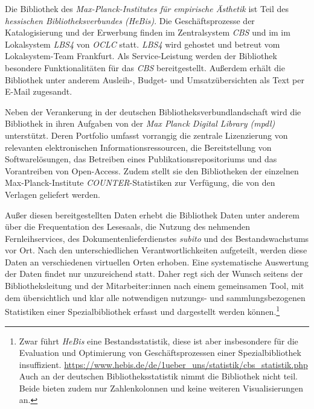 Die Bibliothek des \textit{Max-Planck-Institutes für empirische Ästhetik}
ist Teil des \textit{hessischen Bibliotheksverbundes (HeBis)}. Die Geschäftsprozesse
der Katalogisierung und der Erwerbung finden im Zentralsystem \textit{CBS} und im im Lokalsystem \textit{LBS4} von
\textit{OCLC} statt. \textit{LBS4} wird gehostet und betreut vom Lokalsystem-Team Frankfurt. Als Service-Leistung werden der Bibliothek besondere Funktionalitäten
für das \textit{CBS} bereitgestellt. Außerdem erhält die Bibliothek unter anderem Ausleih-, Budget- und
Umsatzübersichten als Text per E-Mail zugesandt.


Neben der Verankerung in der deutschen Bibliotheksverbundlandschaft
wird die Bibliothek in ihren Aufgaben von der
\textit{Max Planck Digital Library (mpdl)}
unterstützt. Deren Portfolio umfasst vorrangig die zentrale Lizenzierung
von relevanten elektronischen Informationsressourcen, die Bereitstellung
von Softwarelösungen, das Betreiben eines Publikationsrepositoriums und
das Vorantreiben von Open-Access. Zudem stellt sie den Bibliotheken der einzelnen Max-Planck-Institute
\textit{COUNTER}-Statistiken zur Verfügung, die von den Verlagen geliefert werden.


Außer diesen bereitgestellten Daten erhebt die Bibliothek Daten unter anderem über
die Frequentation des Lesesaals, die Nutzung des nehmenden Fernleihservices, des
Dokumentenlieferdienstes \textit{subito} und des Bestandswachstums vor Ort.
Nach den unterschiedlichen Verantwortlichkeiten aufgeteilt, werden diese Daten an verschiedenen virtuellen Orten erhoben.
Eine systematische Auswertung der Daten findet nur unzureichend statt.
Daher regt sich der Wunsch seitens der Bibliotheksleitung und der Mitarbeiter:innen nach einem gemeinsamen Tool,
mit dem übersichtlich und klar alle notwendigen nutzungs- und sammlungsbezogenen Statistiken einer
Spezialbibliothek erfasst und dargestellt werden können.\footnote{Zwar führt \textit{HeBis} eine Bestandsstatistik, diese ist aber insbesondere für die
Evaluation und Optimierung von Geschäftsprozessen einer Spezialbibliothek
insuffizient. \url{https://www.hebis.de/de/1ueber_uns/statistik/cbs_statistik.php} 
Auch an der deutschen Bibliotheksstatistik nimmt die Bibliothek nicht teil. Beide bieten zudem nur Zahlenkolonnen und keine weiteren Visualisierungen an.}
